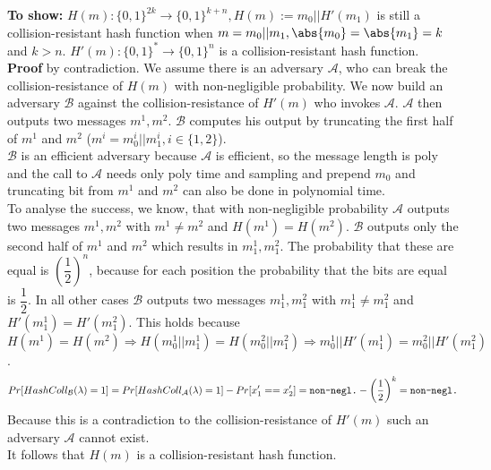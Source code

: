 \textbf{To show: } \(H(m) : \{0,1\}^{2k} \rightarrow \{0,1\}^{k+n}, H(m) := m_0 \vert \vert H'(m_1)\) is still a collision-resistant hash function when \(m = m_0 \vert \vert m_1, \abs{m_0} = \abs{m_1} = k\) and \(k > n\). \(H'(m) : \{0,1\}^{*} \rightarrow \{0,1\}^{n}\) is a collision-resistant hash function.\\
\textbf{Proof} by contradiction. We assume there is an adversary \(\mathcal{A}\), who can break the collision-resistance of \(H(m)\) with non-negligible probability. We now build an adversary \(\mathcal{B}\) against the collision-resistance of \(H'(m)\) who invokes \(\mathcal{A}\).
\(\mathcal{A}\) then outputs two messages \(m^1, m^2\). \(\mathcal{B}\) computes his output by truncating the first half of \(m^1\) and \(m^2\) (\(m^i = m^i_0 \vert \vert m^i_1, i \in \{1,2\}\)). \\
\(\mathcal{B}\) is an efficient adversary because \(\mathcal{A}\) is efficient, so the message length is poly and the call to \(\mathcal{A}\) needs only poly time and sampling and prepend \(m_0\) and truncating bit from \(m^1\) and \(m^2\) can also be done in polynomial time. \\
To analyse the success, we know, that with non-negligible probability \(\mathcal{A}\) outputs two messages \(m^1, m^2\) with \(m^1 \neq m^2\) and \(H(m^1) = H(m^2)\). \(\mathcal{B}\) outputs only the second half of \(m^1\) and \(m^2\) which results in \(m^1_1, m^2_1\). The probability that these are equal is \(\left(\dfrac{1}{2}\right)^{n}\), because for each position the probability that the bits are equal is \(\dfrac{1}{2}\). 
In all other cases \(\mathcal{B}\) outputs two messages \(m^1_1, m^2_1\) with \(m^1_1 \neq m^2_1\) and \(H'(m^1_1) = H'(m^2_1)\). This holds because \(H(m^1) = H(m^2) \Rightarrow H(m^1_0 \vert \vert m^1_1) = H(m^2_0 \vert \vert m^2_1) \Rightarrow m^1_0 \vert \vert H'(m^1_1) = m^2_0 \vert \vert H'(m^2_1)\).
\begin{equation*}
	Pr[HashColl_{\mathcal{B}}(\lambda) = 1] = Pr[HashColl_{\mathcal{A}}(\lambda) = 1] - 	Pr[x_1' == x_2'] = \verb|non-negl.| - \left(\dfrac{1}{2}\right)^{k}  = \verb|non-negl.|
\end{equation*}
Because this is a contradiction to the collision-resistance of \(H'(m)\) such an adversary \(\mathcal{A}\) cannot exist.\\
It follows that \(H(m)\) is a collision-resistant hash function.

